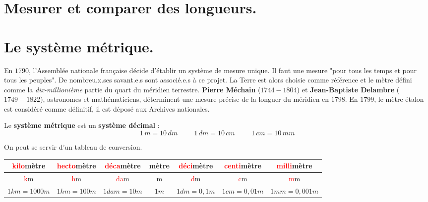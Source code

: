 \begin{pageCours} 

\section{Mesurer et comparer des longueurs.}

\section{Le système métrique.}

\begin{His}
En $1790$, l'Assemblée nationale française décide d'établir un système de mesure unique. Il faut une mesure "pour tous les temps et pour tous les peuples". De nombreu.x.ses savant.e.s sont associé.e.s à ce projet. La Terre est alors choisie comme référence et le mètre défini comme la \textit{dix-millionième} partie du quart du méridien terrestre. \textbf{Pierre Méchain} ($1744-1804$) et \textbf{Jean-Baptiste Delambre} ($1749-1822$), astronomes et mathématiciens, déterminent une mesure précise de la longuer du méridien en $1798$. En $1799$, le mètre étalon est considéré comme définitif, il est déposé aux Archives nationales.
\end{His}

\begin{Def}
Le \textbf{système métrique} est un \textbf{système décimal} :\\
\[1\, m=10\, dm \hspace{1cm} 1\, dm=10\, cm \hspace{1cm}1\, cm=10\, mm\]
\end{Def}

\begin{Mt}
On peut se servir d'un tableau de conversion.
\begin{center}
\begin{tabular}{c|c|c|c|c|c|c}
    \textcolor{red}{kilo}mètre & \textcolor{red}{hecto}mètre & \textcolor{red}{déca}mètre & mètre & \textcolor{red}{déci}mètre & \textcolor{red}{centi}mètre & \textcolor{red}{milli}mètre  \\ \hline 
    \textcolor{red}{k}m & \textcolor{red}{h}m & \textcolor{red}{da}m & m & \textcolor{red}{d}m & \textcolor{red}{c}m & \textcolor{red}{m}m \\ \hline
    \(1 km = 1 000 m\) & \(1 hm = 100 m\) & \(1 dam = 10 m\) & \(1 m\) & \(1 dm = 0,1 m\) & \(1 cm = 0,01 m\) & \(1 mm = 0,001 m\)
\end{tabular}
\end{center}
\end{Mt}


\end{pageCours}
